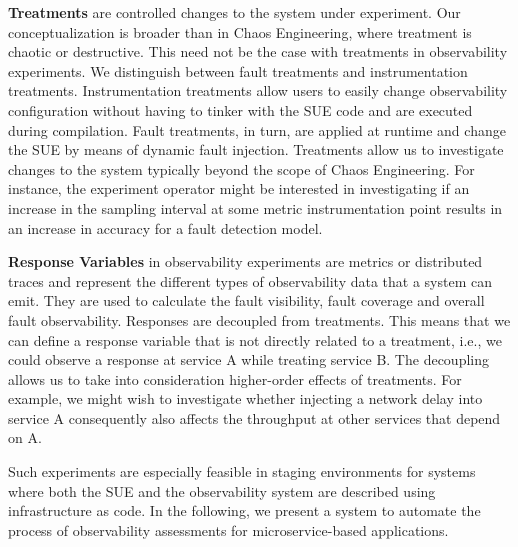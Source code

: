 \textbf{Treatments} are controlled changes to the system under experiment. 
Our conceptualization is broader than in Chaos Engineering, where treatment is chaotic or destructive. This need not be the case with treatments in observability experiments. We distinguish between fault treatments and instrumentation treatments. Instrumentation treatments allow users to easily change observability configuration without having to tinker with the SUE code and are executed during compilation. Fault treatments, in turn, are applied at runtime and change the SUE by means of dynamic fault injection.
Treatments allow us to investigate changes to the system typically beyond the scope of Chaos Engineering. For instance, the experiment operator might be interested in investigating if an increase in the sampling interval at some metric instrumentation point results in an increase in accuracy for a fault detection model. %

\textbf{Response Variables} in observability experiments are metrics or distributed traces and represent the different types of observability data that a system can emit. They are used to calculate the fault visibility, fault coverage and overall fault observability. Responses are decoupled from treatments. This means that we can define a response variable that is not directly related to a treatment, i.e., we could observe a response at service A while treating service B. The decoupling allows us to take into consideration higher-order effects of treatments. For example, we might wish to investigate whether injecting a network delay into service A consequently also affects the throughput at other services that depend on A. 

Such experiments are especially feasible in staging environments for systems where both the SUE and the observability system are described using infrastructure as code. In the following, we present a system to automate the process of observability assessments for microservice-based applications.
